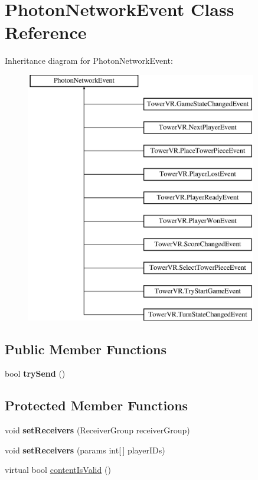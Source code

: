 \hypertarget{class_photon_network_event}{}\section{Photon\+Network\+Event Class Reference}
\label{class_photon_network_event}
Inheritance diagram for Photon\+Network\+Event\+:\begin{figure}[H]
\begin{center}
\leavevmode
\includegraphics[height=11.000000cm]{class_photon_network_event}
\end{center}
\end{figure}
\subsection*{Public Member Functions}
\begin{DoxyCompactItemize}
\item 
bool {\bfseries try\+Send} ()\hypertarget{class_photon_network_event_acbfe71760048a6edf950f710167b56ca}{}\label{class_photon_network_event_acbfe71760048a6edf950f710167b56ca}

\end{DoxyCompactItemize}
\subsection*{Protected Member Functions}
\begin{DoxyCompactItemize}
\item 
void {\bfseries set\+Receivers} (Receiver\+Group receiver\+Group)\hypertarget{class_photon_network_event_a7344442ecce18c3a78594f9a298a2572}{}\label{class_photon_network_event_a7344442ecce18c3a78594f9a298a2572}

\item 
void {\bfseries set\+Receivers} (params int\mbox{[}$\,$\mbox{]} player\+I\+Ds)\hypertarget{class_photon_network_event_a070870e1683624c335c5a9ecb9cb2b29}{}\label{class_photon_network_event_a070870e1683624c335c5a9ecb9cb2b29}

\item 
virtual bool \hyperlink{class_photon_network_event_a82a5487738983085c9e8ac4116474b43}{content\+Is\+Valid} ()
\end{DoxyCompactItemize}
